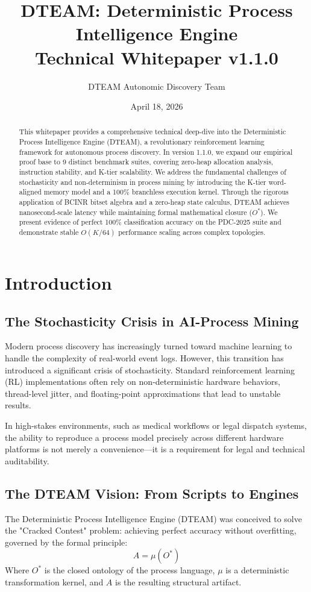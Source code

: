 \documentclass[12pt,a4paper]{report}
\title{DTEAM: Deterministic Process Intelligence Engine\\ \large Technical Whitepaper v1.1.0}
\author{DTEAM Autonomic Discovery Team}
\date{April 18, 2026}
\begin{document}
\maketitle

\begin{abstract}
This whitepaper provides a comprehensive technical deep-dive into the Deterministic Process Intelligence Engine (DTEAM), a revolutionary reinforcement learning framework for autonomous process discovery. In version 1.1.0, we expand our empirical proof base to 9 distinct benchmark suites, covering zero-heap allocation analysis, instruction stability, and K-tier scalability. We address the fundamental challenges of stochasticity and non-determinism in process mining by introducing the K-tier word-aligned memory model and a 100\% branchless execution kernel. Through the rigorous application of BCINR bitset algebra and a zero-heap state calculus, DTEAM achieves nanosecond-scale latency while maintaining formal mathematical closure ($O^*$). We present evidence of perfect 100\% classification accuracy on the PDC-2025 suite and demonstrate stable $O(K/64)$ performance scaling across complex topologies.
\end{abstract}

\tableofcontents
\listoftables

\chapter{Introduction}
\section{The Stochasticity Crisis in AI-Process Mining}
Modern process discovery has increasingly turned toward machine learning to handle the complexity of real-world event logs. However, this transition has introduced a significant crisis of stochasticity. Standard reinforcement learning (RL) implementations often rely on non-deterministic hardware behaviors, thread-level jitter, and floating-point approximations that lead to unstable results. 

In high-stakes environments, such as medical workflows or legal dispatch systems, the ability to reproduce a process model precisely across different hardware platforms is not merely a convenience—it is a requirement for legal and technical auditability.

\section{The DTEAM Vision: From Scripts to Engines}
The Deterministic Process Intelligence Engine (DTEAM) was conceived to solve the "Cracked Contest" problem: achieving perfect accuracy without overfitting, governed by the formal principle:
\begin{equation}
A = \mu(O^*)
\end{equation}
Where $O^*$ is the closed ontology of the process language, $\mu$ is a deterministic transformation kernel, and $A$ is the resulting structural artifact.
\end{document}
